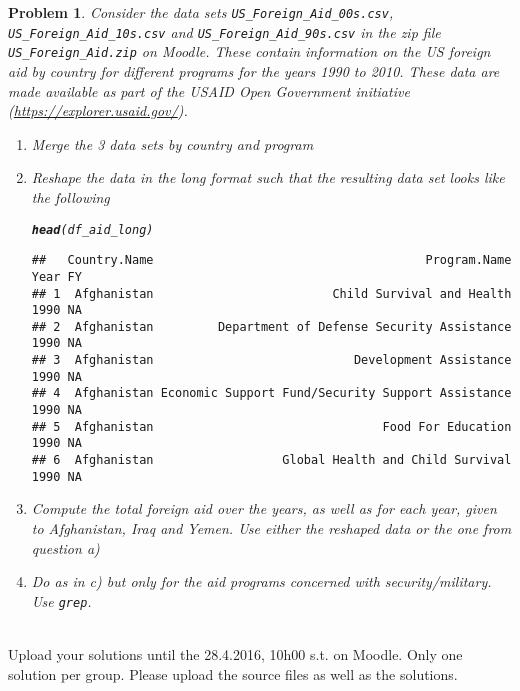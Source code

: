 \documentclass[a4,11pt]{article}\usepackage[]{graphicx}\usepackage[]{color}
\makeatletter
\newcommand{\hlstd}[1]{\textcolor[rgb]{0.345,0.345,0.345}{#1}}%
\newcommand{\hlkwd}[1]{\textcolor[rgb]{0.737,0.353,0.396}{\textbf{#1}}}%
\newenvironment{kframe}{%
 \def\at@end@of@kframe{}%
 \ifinner\ifhmode%
  \def\at@end@of@kframe{\end{minipage}}%
  \begin{minipage}{\columnwidth}%
 \fi\fi%
 \def\FrameCommand##1{\hskip\@totalleftmargin \hskip-\fboxsep
 \colorbox{shadecolor}{##1}\hskip-\fboxsep
     \hskip-\linewidth \hskip-\@totalleftmargin \hskip\columnwidth}%
 \MakeFramed {\advance\hsize-\width
   \@totalleftmargin\z@ \linewidth\hsize
   \@setminipage}}%
 {\par\unskip\endMakeFramed%
 \at@end@of@kframe}
\newenvironment{knitrout}{}{} %
\newtheorem{exercise}{Problem}
\newenvironment{aufgabe}{\begin{exercise}\sf}{\end{exercise} \bigskip}
\newcommand{\footer}{ \vfill
  \mbox{}\hrulefill\\
  Upload your solutions until the 28.4.2016, 10h00 s.t. on
  Moodle. Only one solution per group. Please upload the source files
  as well as the solutions.}
\makeatother
\begin{document}
\begin{aufgabe}
  Consider the data sets {\tt US\_Foreign\_Aid\_00s.csv}, {\tt
    US\_Foreign\_Aid\_10s.csv} and {\tt US\_Foreign\_Aid\_90s.csv} in the
  zip file {\tt US\_Foreign\_Aid.zip} on Moodle. These contain
  information on the US foreign aid by country for different programs
  for the years 1990 to 2010. These data are made available as part of
  the USAID Open Government initiative
  (\url{https://explorer.usaid.gov/}). 
  
  \begin{enumerate}
  \item Merge the 3 data sets by country and program
  \item Reshape the data in the long format such that the resulting
    data set looks like the following
\begin{knitrout}\scriptsize
{}\color{fgcolor}\begin{kframe}
\begin{alltt}
\hlkwd{head}\hlstd{(df_aid_long)}
\end{alltt}
\begin{verbatim}
##   Country.Name                                      Program.Name Year FY
## 1  Afghanistan                         Child Survival and Health 1990 NA
## 2  Afghanistan         Department of Defense Security Assistance 1990 NA
## 3  Afghanistan                            Development Assistance 1990 NA
## 4  Afghanistan Economic Support Fund/Security Support Assistance 1990 NA
## 5  Afghanistan                                Food For Education 1990 NA
## 6  Afghanistan                  Global Health and Child Survival 1990 NA
\end{verbatim}
\end{kframe}
\end{knitrout}
\item Compute the total foreign aid over the years, as well as for each
  year, given to Afghanistan, Iraq and Yemen. Use either the reshaped
  data or the one from question a)
\item Do as in c) but only for the aid programs concerned with
  security/military. Use {\tt grep}.

  \end{enumerate}
  
  
\end{aufgabe}

\footer
\end{document}
